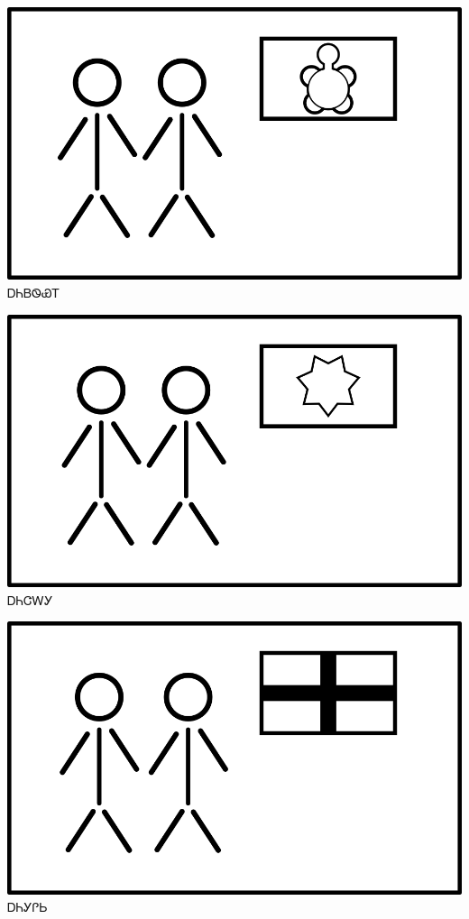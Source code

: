 \documentclass[avery5371]{flashcards}%
\begin{document}

    \begin{flashcard}{
        \includegraphics[width=0.95\columnwidth,height=.51\columnwidth,keepaspectratio]{../artwork/flags/anidaksi-flag}
    }
        \Huge ᎠᏂᏴᏫᏯᎢ
    \end{flashcard}

    \begin{flashcard}{
        \includegraphics[width=0.95\columnwidth,height=.51\columnwidth,keepaspectratio]{../artwork/flags/anijalagi-flag}
    }
        \Huge ᎠᏂᏣᎳᎩ
    \end{flashcard}

    \begin{flashcard}{
        \includegraphics[width=0.95\columnwidth,height=.51\columnwidth,keepaspectratio]{../artwork/flags/anigilisi-flag}
    }
        \Huge ᎠᏂᎩᎵᏏ
    \end{flashcard}
\end{document}
